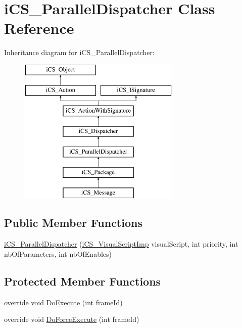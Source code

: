 \hypertarget{classi_c_s___parallel_dispatcher}{\section{i\+C\+S\+\_\+\+Parallel\+Dispatcher Class Reference}
\label{classi_c_s___parallel_dispatcher}
}
Inheritance diagram for i\+C\+S\+\_\+\+Parallel\+Dispatcher\+:\begin{figure}[H]
\begin{center}
\leavevmode
\includegraphics[height=7.000000cm]{classi_c_s___parallel_dispatcher}
\end{center}
\end{figure}
\subsection*{Public Member Functions}
\begin{DoxyCompactItemize}
\item 
\hyperlink{classi_c_s___parallel_dispatcher_a00ae7e26c4b80ffb1a7ad6404fc480ca}{i\+C\+S\+\_\+\+Parallel\+Dispatcher} (\hyperlink{classi_c_s___visual_script_imp}{i\+C\+S\+\_\+\+Visual\+Script\+Imp} visual\+Script, int priority, int nb\+Of\+Parameters, int nb\+Of\+Enables)
\end{DoxyCompactItemize}
\subsection*{Protected Member Functions}
\begin{DoxyCompactItemize}
\item 
override void \hyperlink{classi_c_s___parallel_dispatcher_a5b849e00e0e19b961462f0d7ab83f4a0}{Do\+Execute} (int frame\+Id)
\item 
override void \hyperlink{classi_c_s___parallel_dispatcher_a04825bee27b0c914fc9f342dcfff92f1}{Do\+Force\+Execute} (int frame\+Id)
\end{DoxyCompactItemize}
